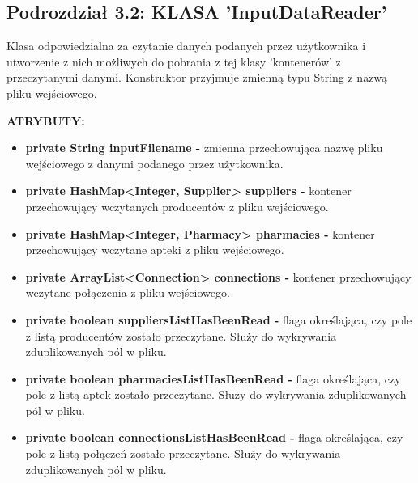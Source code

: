 \documentclass[a4paper]{article}
\begin{document}
\subsection*{Podrozdział 3.2: KLASA 'InputDataReader'}
\begin{flushleft}
Klasa odpowiedzialna za czytanie danych podanych przez użytkownika i utworzenie z nich możliwych do pobrania z tej klasy 'kontenerów' z przeczytanymi danymi. Konstruktor przyjmuje zmienną typu String z nazwą pliku wejściowego.
\end{flushleft} 
\textbf{ATRYBUTY:}
\begin{itemize}
\item \textbf{private String inputFilename -} zmienna przechowująca nazwę pliku wejściowego z danymi podanego przez użytkownika.
\item \textbf{private HashMap<Integer, Supplier> suppliers -} kontener przechowujący wczytanych producentów z pliku wejściowego.
\item \textbf{private HashMap<Integer, Pharmacy> pharmacies -} kontener przechowujący wczytane apteki z pliku wejściowego.
\item \textbf{private ArrayList<Connection> connections -} kontener przechowujący wczytane połączenia z pliku wejściowego.
\item \textbf{private boolean suppliersListHasBeenRead -} flaga określająca, czy pole z listą producentów zostało przeczytane. Służy do wykrywania zduplikowanych pól w pliku.
\item \textbf{private boolean pharmaciesListHasBeenRead -} flaga określająca, czy pole z listą aptek zostało przeczytane. Służy do wykrywania zduplikowanych pól w pliku.
\item \textbf{private boolean connectionsListHasBeenRead -} flaga określająca, czy pole z listą połączeń zostało przeczytane. Służy do wykrywania zduplikowanych pól w pliku.
\end{itemize}
\end{document}
